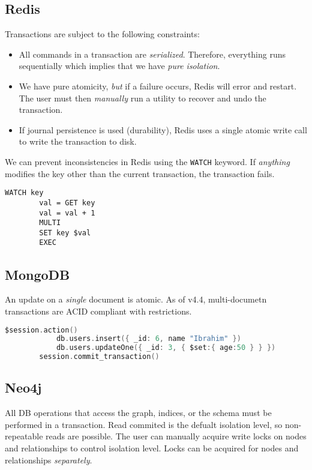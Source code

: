 \documentclass{report}
\newenvironment{example}{\begin{tcolorbox}[title={Example},colback=green!5!white,colframe=black!75!green]}{\end{tcolorbox}}
\renewcommand{\tt}[1]{\texttt{{#1}}}
\renewcommand{\it}[1]{\textit{{#1}}}
\begin{document}
\subsection{Redis}
Transactions are subject to the following constraints:
\begin{itemize}[label=$\to$]
    \item All commands in a transaction are \it{serialized}. Therefore,
        everything runs sequentially which implies that we have \it{pure
        isolation}.
    \item We have pure atomicity, \it{but} if a failure occurs, Redis will error
        and restart. The user must then \it{manually} run a utility to recover
        and undo the transaction.
    \item If journal persistence is used (durability), Redis uses a single
        atomic write call to write the transaction to disk.
\end{itemize}
\begin{example}
    We can prevent inconsistencies in Redis using the \tt{WATCH} keyword. If
    \it{anything} modifies the key other than the current transaction, the
    transaction fails.
    \lstset{ basicstyle=\small\ttfamily, mathescape=false }
    \begin{lstlisting}[style=colorEX]
        WATCH key
        val = GET key
        val = val + 1
        MULTI
        SET key $val
        EXEC
    \end{lstlisting}
\end{example}

\subsection{MongoDB}
An update on a \it{single} document is atomic. As of v4.4, multi-documetn
transactions are ACID compliant with restrictions.
\begin{example}
    \lstset{ basicstyle=\small\ttfamily, mathescape=false }
    \begin{lstlisting}[language=C, style=colorEX]
        $session.action()
            db.users.insert({ _id: 6, name "Ibrahim" })
            db.users.updateOne({ _id: 3, { $set:{ age:50 } } })
        session.commit_transaction()
    \end{lstlisting}
\end{example}

\subsection{Neo4j}
All DB operations that access the graph, indices, or the schema must be
performed in a transaction. Read commited is the defualt isolation level, so
non-repeatable reads are possible. The user can manually acquire write locks on
nodes and relationships to control isolation level. Locks can be acquired for
nodes and relationships \it{separately}.
\end{document}
